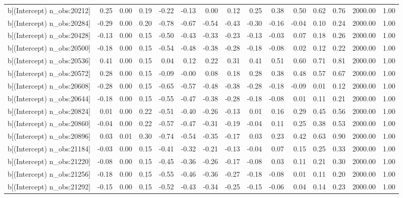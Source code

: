 \begin{table}[ht]
\begin{tabular}{rrrrrrrrrrrrrrr}
  b[(Intercept) n\_obs:20212] & 0.25 & 0.00 & 0.19 & -0.22 & -0.13 & 0.00 & 0.12 & 0.25 & 0.38 & 0.50 & 0.62 & 0.76 & 2000.00 & 1.00 \\ 
  b[(Intercept) n\_obs:20284] & -0.29 & 0.00 & 0.20 & -0.78 & -0.67 & -0.54 & -0.43 & -0.30 & -0.16 & -0.04 & 0.10 & 0.24 & 2000.00 & 1.00 \\ 
  b[(Intercept) n\_obs:20428] & -0.13 & 0.00 & 0.15 & -0.50 & -0.43 & -0.33 & -0.23 & -0.13 & -0.03 & 0.07 & 0.18 & 0.26 & 2000.00 & 1.00 \\ 
  b[(Intercept) n\_obs:20500] & -0.18 & 0.00 & 0.15 & -0.54 & -0.48 & -0.38 & -0.28 & -0.18 & -0.08 & 0.02 & 0.12 & 0.22 & 2000.00 & 1.00 \\ 
  b[(Intercept) n\_obs:20536] & 0.41 & 0.00 & 0.15 & 0.04 & 0.12 & 0.22 & 0.31 & 0.41 & 0.51 & 0.60 & 0.71 & 0.81 & 2000.00 & 1.00 \\ 
  b[(Intercept) n\_obs:20572] & 0.28 & 0.00 & 0.15 & -0.09 & -0.00 & 0.08 & 0.18 & 0.28 & 0.38 & 0.48 & 0.57 & 0.67 & 2000.00 & 1.00 \\ 
  b[(Intercept) n\_obs:20608] & -0.28 & 0.00 & 0.15 & -0.65 & -0.57 & -0.48 & -0.38 & -0.28 & -0.18 & -0.09 & 0.01 & 0.12 & 2000.00 & 1.00 \\ 
  b[(Intercept) n\_obs:20644] & -0.18 & 0.00 & 0.15 & -0.55 & -0.47 & -0.38 & -0.28 & -0.18 & -0.08 & 0.01 & 0.11 & 0.21 & 2000.00 & 1.00 \\ 
  b[(Intercept) n\_obs:20824] & 0.01 & 0.00 & 0.22 & -0.51 & -0.40 & -0.26 & -0.13 & 0.01 & 0.16 & 0.29 & 0.45 & 0.56 & 2000.00 & 1.00 \\ 
  b[(Intercept) n\_obs:20860] & -0.04 & 0.00 & 0.22 & -0.57 & -0.47 & -0.31 & -0.19 & -0.04 & 0.11 & 0.25 & 0.38 & 0.53 & 2000.00 & 1.00 \\ 
  b[(Intercept) n\_obs:20896] & 0.03 & 0.01 & 0.30 & -0.74 & -0.54 & -0.35 & -0.17 & 0.03 & 0.23 & 0.42 & 0.63 & 0.90 & 2000.00 & 1.00 \\ 
  b[(Intercept) n\_obs:21184] & -0.03 & 0.00 & 0.15 & -0.41 & -0.32 & -0.21 & -0.13 & -0.04 & 0.07 & 0.15 & 0.25 & 0.33 & 2000.00 & 1.00 \\ 
  b[(Intercept) n\_obs:21220] & -0.08 & 0.00 & 0.15 & -0.45 & -0.36 & -0.26 & -0.17 & -0.08 & 0.03 & 0.11 & 0.21 & 0.30 & 2000.00 & 1.00 \\ 
  b[(Intercept) n\_obs:21256] & -0.18 & 0.00 & 0.15 & -0.55 & -0.46 & -0.36 & -0.27 & -0.18 & -0.08 & 0.01 & 0.11 & 0.20 & 2000.00 & 1.00 \\ 
  b[(Intercept) n\_obs:21292] & -0.15 & 0.00 & 0.15 & -0.52 & -0.43 & -0.34 & -0.25 & -0.15 & -0.06 & 0.04 & 0.14 & 0.23 & 2000.00 & 1.00 \\ 

\end{tabular}
\end{table}
